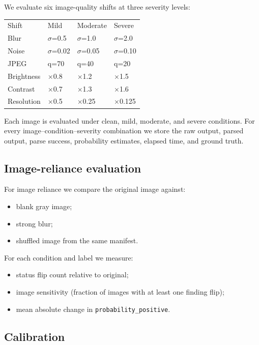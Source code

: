 We evaluate six image-quality shifts at three severity levels:

\begin{table}[t]
\centering
\small
\begin{tabular}{llll}
\hline
Shift & Mild & Moderate & Severe \\
Blur & $\sigma$=0.5 & $\sigma$=1.0 & $\sigma$=2.0 \\
Noise & $\sigma$=0.02 & $\sigma$=0.05 & $\sigma$=0.10 \\
JPEG & q=70 & q=40 & q=20 \\
Brightness & $\times$0.8 & $\times$1.2 & $\times$1.5 \\
Contrast & $\times$0.7 & $\times$1.3 & $\times$1.6 \\
Resolution & $\times$0.5 & $\times$0.25 & $\times$0.125 \\
\hline
\end{tabular}
\end{table}


Each image is evaluated under clean, mild, moderate, and severe conditions. For every image--condition--severity combination we store the raw output, parsed output, parse success, probability estimates, elapsed time, and ground truth.

\subsection{Image-reliance evaluation}

For image reliance we compare the original image against:

\begin{itemize}
\item blank gray image;
\item strong blur;
\item shuffled image from the same manifest.
\end{itemize}

For each condition and label we measure:

\begin{itemize}
\item status flip count relative to original;
\item image sensitivity (fraction of images with at least one finding flip);
\item mean absolute change in \texttt{probability\_positive}.
\end{itemize}

\subsection{Calibration}


